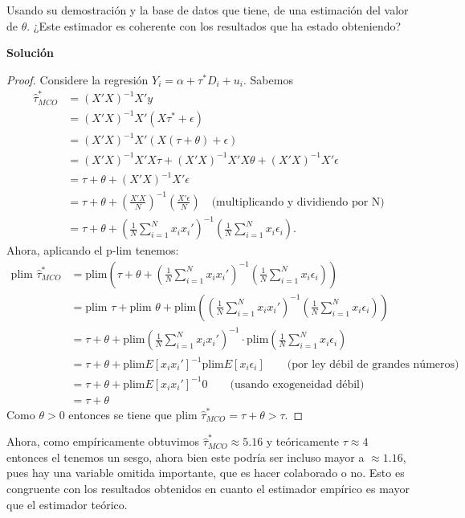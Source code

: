 \documentclass[a4paper, answers, addpoints, 11pt]{exam}
\newenvironment{solucion}{%
  \begin{mdframed}[
    backgroundcolor=blue!5,    %
    linecolor=blue!50,          %
    linewidth=2pt,              %
    leftmargin=10pt,            %
    rightmargin=10pt,           %
    topline=true,              %
    bottomline=true,            %
    roundcorner=10pt,           %
    innerleftmargin=10pt,       %
    innerrightmargin=10pt,      %
    innerbottommargin=10pt,     %
    innertopmargin=10pt         %
  ]%
  \begin{tcolorbox}[colframe=blue!50!black, colback=blue!50, coltitle=white, sharp corners=all, boxrule=1mm, width=\textwidth, halign=left, valign=center, top=0mm, bottom=0mm, left=0mm, right=0mm] \textbf{Solución} \end{tcolorbox} }{\end{mdframed}}
\begin{document}
\begin{itemize}
    Usando su demostración y la base de datos que tiene, de una estimación del valor de $\theta$. ¿Este estimador es coherente con los resultados que ha estado obteniendo?
     \begin{solucion}
       
        \begin{proof}
       Considere la regresión $Y_i =\alpha+ \tau^* D_i + u_i$. Sabemos 
\begin{align*}
    \hat{\tau}^*_{MCO} &=(X'X)^{-1} X' y \\
    &= (X'X)^{-1} X' (X \tau^* + \epsilon) \\
    &= (X'X)^{-1} X' (X (\tau + \theta) + \epsilon) \\
    &= (X'X)^{-1} X' X \tau + (X'X)^{-1} X' X\theta + (X'X)^{-1} X' \epsilon \\
    &= \tau + \theta + (X'X)^{-1} X' \epsilon \\
    &= \tau + \theta + \left( \frac{X'X}{N} \right)^{-1} \left( \frac{X'\epsilon}{N} \right) \quad \text{(multiplicando y dividiendo por N)} \\
    &= \tau + \theta + \left( \frac{1}{N} \sum_{i=1}^{N} x_i x_i' \right)^{-1} \left( \frac{1}{N} \sum_{i=1}^{N} x_i \epsilon_i \right).
  \end{align*}
  Ahora, aplicando el p-lim tenemos:
  \begin{align*}
    \text{plim } \hat{\tau}^*_{MCO} &= \text{plim} \left( \tau + \theta+ \left( \frac{1}{N} \sum_{i=1}^{N} x_i x_i' \right)^{-1} 
    \left( \frac{1}{N} \sum_{i=1}^{N} x_i \epsilon_i \right) \right) \\
    &= \text{plim } \tau + \text{plim } \theta +\text{plim} \left( \left( \frac{1}{N} \sum_{i=1}^{N} x_i x_i' \right)^{-1} 
    \left( \frac{1}{N} \sum_{i=1}^{N} x_i \epsilon_i \right) \right) \\
    &= \tau +\theta+ \text{plim} \left( \frac{1}{N} \sum_{i=1}^{N} x_i x_i' \right)^{-1} 
    \cdot \text{plim} \left( \frac{1}{N} \sum_{i=1}^{N} x_i \epsilon_i \right) \\
      &= \tau +\theta + \text{plim} E[x_i x_i'] ^{-1} \text{plim} E[x_i \epsilon_i] \qquad \text{(por ley débil de grandes números) }\\
      &= \tau +\theta + \text{plim} E[x_i x_i'] ^{-1} 0 \qquad \text{(usando exogeneidad débil) }\\
       &= \tau +\theta
    \end{align*}
   Como $\theta > 0$ entonces se tiene que $\text{plim } \hat{\tau}^*_{MCO}=\tau + \theta >\tau$.
        \end{proof}
        Ahora, como empíricamente obtuvimos $\hat{\tau}^*_{MCO} \approx 5.16$ y teóricamente $\tau \approx 4$ entonces el tenemos un sesgo, ahora bien este podría ser incluso mayor a $\approx 1.16$, pues hay una variable omitida importante, que es hacer colaborado o no.  Esto es congruente con los resultados obtenidos en cuanto el estimador empírico es mayor que el estimador teórico.
        \end{solucion}


\end{itemize}
\end{document}
